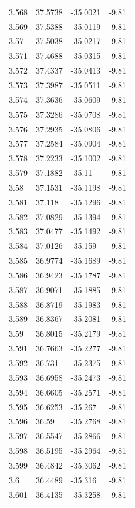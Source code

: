 \begin{tabular}{llll}
3.568 & 37.5738 & -35.0021 & -9.81 \\
3.569 & 37.5388 & -35.0119 & -9.81 \\
3.57 & 37.5038 & -35.0217 & -9.81 \\
3.571 & 37.4688 & -35.0315 & -9.81 \\
3.572 & 37.4337 & -35.0413 & -9.81 \\
3.573 & 37.3987 & -35.0511 & -9.81 \\
3.574 & 37.3636 & -35.0609 & -9.81 \\
3.575 & 37.3286 & -35.0708 & -9.81 \\
3.576 & 37.2935 & -35.0806 & -9.81 \\
3.577 & 37.2584 & -35.0904 & -9.81 \\
3.578 & 37.2233 & -35.1002 & -9.81 \\
3.579 & 37.1882 & -35.11 & -9.81 \\
3.58 & 37.1531 & -35.1198 & -9.81 \\
3.581 & 37.118 & -35.1296 & -9.81 \\
3.582 & 37.0829 & -35.1394 & -9.81 \\
3.583 & 37.0477 & -35.1492 & -9.81 \\
3.584 & 37.0126 & -35.159 & -9.81 \\
3.585 & 36.9774 & -35.1689 & -9.81 \\
3.586 & 36.9423 & -35.1787 & -9.81 \\
3.587 & 36.9071 & -35.1885 & -9.81 \\
3.588 & 36.8719 & -35.1983 & -9.81 \\
3.589 & 36.8367 & -35.2081 & -9.81 \\
3.59 & 36.8015 & -35.2179 & -9.81 \\
3.591 & 36.7663 & -35.2277 & -9.81 \\
3.592 & 36.731 & -35.2375 & -9.81 \\
3.593 & 36.6958 & -35.2473 & -9.81 \\
3.594 & 36.6605 & -35.2571 & -9.81 \\
3.595 & 36.6253 & -35.267 & -9.81 \\
3.596 & 36.59 & -35.2768 & -9.81 \\
3.597 & 36.5547 & -35.2866 & -9.81 \\
3.598 & 36.5195 & -35.2964 & -9.81 \\
3.599 & 36.4842 & -35.3062 & -9.81 \\
3.6 & 36.4489 & -35.316 & -9.81 \\
3.601 & 36.4135 & -35.3258 & -9.81 \\

\end{tabular}
